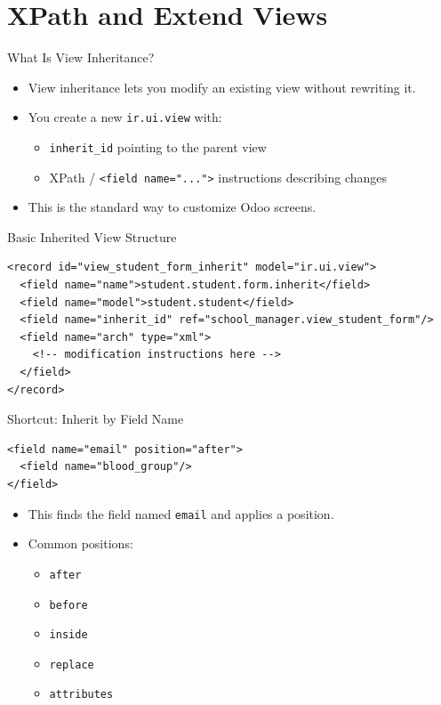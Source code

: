\section{XPath and Extend Views}

\begin{frame}{What Is View Inheritance?}
	\begin{itemize}
		\item View inheritance lets you modify an existing view without rewriting it.
		\item You create a new \texttt{ir.ui.view} with:
		\begin{itemize}
			\item \texttt{inherit\_id} pointing to the parent view
			\item XPath / \texttt{<field name="...">} instructions describing changes
		\end{itemize}
		\item This is the standard way to customize Odoo screens.
	\end{itemize}
\end{frame}

\begin{frame}[fragile]{Basic Inherited View Structure}
\begin{lstlisting}[style=xml]
<record id="view_student_form_inherit" model="ir.ui.view">
  <field name="name">student.student.form.inherit</field>
  <field name="model">student.student</field>
  <field name="inherit_id" ref="school_manager.view_student_form"/>
  <field name="arch" type="xml">
	<!-- modification instructions here -->
  </field>
</record>
\end{lstlisting}
\end{frame}

\begin{frame}[fragile]{Shortcut: Inherit by Field Name}
\begin{lstlisting}[style=xml]
<field name="email" position="after">
  <field name="blood_group"/>
</field>
\end{lstlisting}
	\begin{itemize}
		\item This finds the field named \texttt{email} and applies a position.
		\item Common positions:
		\begin{itemize}
			\item \texttt{after}
			\item \texttt{before}
			\item \texttt{inside}
			\item \texttt{replace}
			\item \texttt{attributes}
		\end{itemize}
	\end{itemize}
\end{frame}

